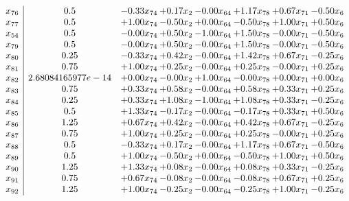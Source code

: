 \documentclass[8pt]{article}
\begin{document}
\[\begin{array}{c| c c@{\hskip 2pt} c@{\hskip 2pt} c@{\hskip 2pt} c@{\hskip 2pt} c@{\hskip 2pt} c@{\hskip 2pt} }
 x_{76}   &  0.5 & -0.33 x_{74} & +  0.17 x_{2} & -0.00 x_{64} & +  1.17 x_{78} & +  0.67 x_{71} & -0.50 x_{6}\\
 x_{77}   &  0.5 & +  1.00 x_{74} & -0.50 x_{2} & +  0.00 x_{64} & -0.50 x_{78} & +  1.00 x_{71} & +  0.50 x_{6}\\
 x_{54}   &  0.5 & -0.00 x_{74} & +  0.50 x_{2} & -1.00 x_{64} & +  1.50 x_{78} & -0.00 x_{71} & -0.50 x_{6}\\
 x_{79}   &  0.5 & -0.00 x_{74} & +  0.50 x_{2} & -0.00 x_{64} & +  1.50 x_{78} & -0.00 x_{71} & -0.50 x_{6}\\
 x_{80}   &  0.25 & -0.33 x_{74} & +  0.42 x_{2} & -0.00 x_{64} & +  1.42 x_{78} & +  0.67 x_{71} & -0.25 x_{6}\\
 x_{81}   &  0.75 & +  1.00 x_{74} & +  0.25 x_{2} & -0.00 x_{64} & +  0.25 x_{78} & -0.00 x_{71} & +  0.25 x_{6}\\
 x_{82}   &  2.68084165977e-14 & +  0.00 x_{74} & -0.00 x_{2} & +  1.00 x_{64} & -0.00 x_{78} & +  0.00 x_{71} & +  0.00 x_{6}\\
 x_{83}   &  0.75 & +  0.33 x_{74} & +  0.58 x_{2} & -0.00 x_{64} & +  0.58 x_{78} & +  0.33 x_{71} & +  0.25 x_{6}\\
 x_{84}   &  0.25 & +  0.33 x_{74} & +  1.08 x_{2} & -1.00 x_{64} & +  1.08 x_{78} & +  0.33 x_{71} & -0.25 x_{6}\\
 x_{85}   &  0.5 & +  1.33 x_{74} & -0.17 x_{2} & -0.00 x_{64} & -0.17 x_{78} & +  0.33 x_{71} & +  0.50 x_{6}\\
 x_{86}   &  1.25 & +  0.67 x_{74} & +  0.42 x_{2} & -0.00 x_{64} & +  0.42 x_{78} & +  0.67 x_{71} & -0.25 x_{6}\\
 x_{87}   &  0.75 & +  1.00 x_{74} & +  0.25 x_{2} & -0.00 x_{64} & +  0.25 x_{78} & -0.00 x_{71} & +  0.25 x_{6}\\
 x_{88}   &  0.5 & -0.33 x_{74} & +  0.17 x_{2} & -0.00 x_{64} & +  1.17 x_{78} & +  0.67 x_{71} & -0.50 x_{6}\\
 x_{89}   &  0.5 & +  1.00 x_{74} & -0.50 x_{2} & +  0.00 x_{64} & -0.50 x_{78} & +  1.00 x_{71} & +  0.50 x_{6}\\
 x_{90}   &  1.25 & +  1.33 x_{74} & +  0.08 x_{2} & -0.00 x_{64} & +  0.08 x_{78} & +  0.33 x_{71} & -0.25 x_{6}\\
 x_{91}   &  0.75 & +  0.67 x_{74} & -0.08 x_{2} & -0.00 x_{64} & -0.08 x_{78} & +  0.67 x_{71} & +  0.25 x_{6}\\
 x_{92}   &  1.25 & +  1.00 x_{74} & -0.25 x_{2} & -0.00 x_{64} & -0.25 x_{78} & +  1.00 x_{71} & -0.25 x_{6}\\

\end{array}\]
\end{document}
